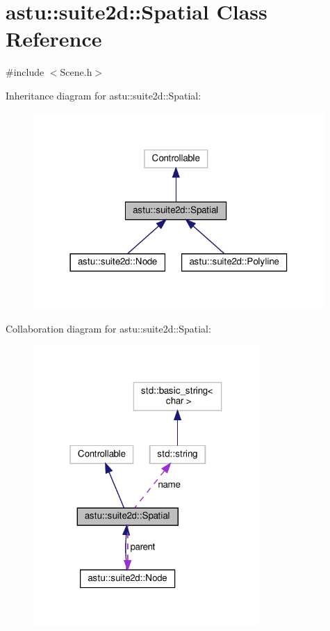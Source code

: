 \hypertarget{classastu_1_1suite2d_1_1Spatial}{}\section{astu\+:\+:suite2d\+:\+:Spatial Class Reference}
\label{classastu_1_1suite2d_1_1Spatial}


{\ttfamily \#include $<$Scene.\+h$>$}



Inheritance diagram for astu\+:\+:suite2d\+:\+:Spatial\+:\nopagebreak
\begin{figure}[H]
\begin{center}
\leavevmode
\includegraphics[width=314pt]{classastu_1_1suite2d_1_1Spatial__inherit__graph}
\end{center}
\end{figure}


Collaboration diagram for astu\+:\+:suite2d\+:\+:Spatial\+:\nopagebreak
\begin{figure}[H]
\begin{center}
\leavevmode
\includegraphics[width=244pt]{classastu_1_1suite2d_1_1Spatial__coll__graph}
\end{center}
\end{figure}
